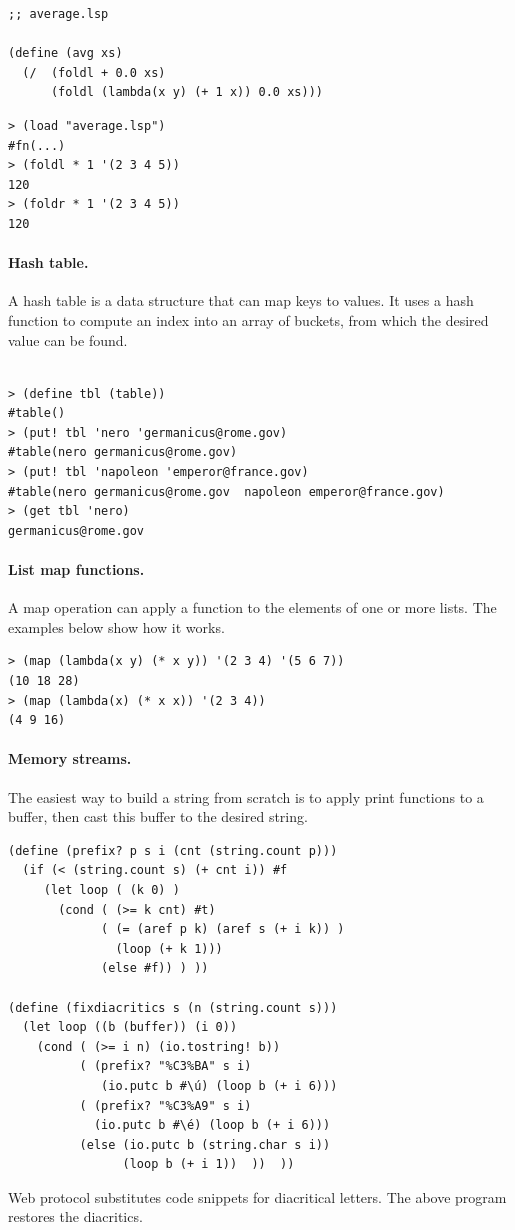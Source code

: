 \documentclass[a4paper,12pt]{book}
\newenvironment{fmpage}[1]
           {\begin{lrbox}{\fmbox}\begin{minipage}{#1}}
           {\end{minipage}\end{lrbox}\fbox{\usebox{\fmbox}}}
\begin{document}
\begin{fmpage}{0.9\textwidth}
\begin{verbatim}
;; average.lsp

(define (avg xs)
  (/  (foldl + 0.0 xs)
      (foldl (lambda(x y) (+ 1 x)) 0.0 xs)))
\end{verbatim}
\end{fmpage}
\begin{verbatim}
> (load "average.lsp")
#fn(...)
> (foldl * 1 '(2 3 4 5))
120
> (foldr * 1 '(2 3 4 5))
120
\end{verbatim}

\paragraph{Hash table.}
A hash table is a data structure that can map keys to values. 
It uses a hash function to compute an index 
into an array of buckets, from which the desired
value can be found.
\begin{verbatim}

> (define tbl (table))
#table()
> (put! tbl 'nero 'germanicus@rome.gov)
#table(nero germanicus@rome.gov)
> (put! tbl 'napoleon 'emperor@france.gov)
#table(nero germanicus@rome.gov  napoleon emperor@france.gov)
> (get tbl 'nero)
germanicus@rome.gov
\end{verbatim}

\paragraph{List map functions.} A map operation can
apply a function to the elements of one or more lists.
The examples below show how it works.


\begin{verbatim}
> (map (lambda(x y) (* x y)) '(2 3 4) '(5 6 7))
(10 18 28)
> (map (lambda(x) (* x x)) '(2 3 4))
(4 9 16)
\end{verbatim}

\paragraph{Memory streams.} The easiest way to build a
string from scratch is to apply print functions 
to a buffer, then cast this buffer to the desired
string.

\begin{verbatim}
(define (prefix? p s i (cnt (string.count p)))
  (if (< (string.count s) (+ cnt i)) #f 
     (let loop ( (k 0) )
       (cond ( (>= k cnt) #t)
             ( (= (aref p k) (aref s (+ i k)) )
               (loop (+ k 1)))
             (else #f)) ) ))
            
(define (fixdiacritics s (n (string.count s)))
  (let loop ((b (buffer)) (i 0))
    (cond ( (>= i n) (io.tostring! b))
          ( (prefix? "%C3%BA" s i)
             (io.putc b #\ú) (loop b (+ i 6)))
          ( (prefix? "%C3%A9" s i)
            (io.putc b #\é) (loop b (+ i 6)))
          (else (io.putc b (string.char s i))
                (loop b (+ i 1))  ))  ))
\end{verbatim}
Web protocol substitutes code snippets for
diacritical letters. The above program
restores the diacritics.
\end{document}
